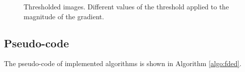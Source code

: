 \documentclass{ipol}
\numberwithin{equation}{section}
\numberwithin{table}{section}
\begin{document}
{\begin{figure}[t!]
	\centering
	\quad
	\quad
	\caption{Thresholded images. Different values of the threshold applied to the magnitude of the gradient.}
	\label{fig:thresholding}
\end{figure}



\subsection{Pseudo-code}

The pseudo-code of implemented algorithms is shown in Algorithm \ref{algo:fded}.

\clearpage

}
\end{document}
